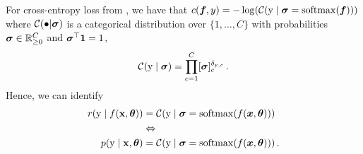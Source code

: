 \begin{example}\label{ex:cross_entropy_loss_probabilistic}
  For cross-entropy loss from , we have that $c({\bm{f}}, y) = - \log( {\mathcal{C}}({\textnormal{y}} \mid {\bm{\sigma}} = \mathrm{softmax}({\bm{f}}) ))$ where ${\mathcal{C}}(\bullet | {\bm{\sigma}})$ is a categorical distribution over $\{1, \dots, C\}$ with probabilities ${\bm{\sigma}} \in {\mathbb{R}}^C_{\ge 0}$ and ${\bm{\sigma}}^\top {\bm{1}} = 1$,
  \begin{align*}
    {\mathcal{C}}({\textnormal{y}} \mid {\bm{\sigma}})
    =
    \prod_{c=1}^C [{\bm{\sigma}}]_c^{\delta_{{\textnormal{y}},c}}\,.
  \end{align*}
  Hence, we can identify
  \begin{align*}
    r({\textnormal{y}} \mid f({\mathbf{x}}, {\bm{\theta}})) & = {\mathcal{C}}({\textnormal{y}} \mid {\bm{\sigma}} = \mathrm{softmax}(f({\bm{x}}, {\bm{\theta}})))\,
    \\
                                 & \Leftrightarrow
    \\
    p({\textnormal{y}} \mid {\mathbf{x}}, {\bm{\theta}})    & = {\mathcal{C}}({\textnormal{y}} \mid {\bm{\sigma}} = \mathrm{softmax}(f({\bm{x}}, {\bm{\theta}})))\,.
  \end{align*}
\end{example}
